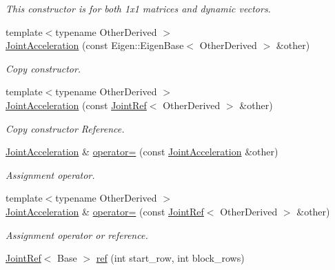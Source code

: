 \begin{DoxyCompactItemize}
\begin{DoxyCompactList}\small\item\em This constructor is for both 1x1 matrices and dynamic vectors. \end{DoxyCompactList}\item 
{\footnotesize template$<$typename Other\+Derived $>$ }\\\hyperlink{classow__core_1_1JointAcceleration_a84e8c4190777f4f93b7a45f5e0195d5d}{Joint\+Acceleration} (const Eigen\+::\+Eigen\+Base$<$ Other\+Derived $>$ \&other)
\begin{DoxyCompactList}\small\item\em Copy constructor. \end{DoxyCompactList}\item 
{\footnotesize template$<$typename Other\+Derived $>$ }\\\hyperlink{classow__core_1_1JointAcceleration_a2991fa7f90c16d8aa34dabbee91c853d}{Joint\+Acceleration} (const \hyperlink{classow__core_1_1JointRef}{Joint\+Ref}$<$ Other\+Derived $>$ \&other)
\begin{DoxyCompactList}\small\item\em Copy constructor Reference. \end{DoxyCompactList}\item 
\hyperlink{classow__core_1_1JointAcceleration}{Joint\+Acceleration} \& \hyperlink{classow__core_1_1JointAcceleration_a7d3a9a810ddf3b1d6e82d8930d46765b}{operator=} (const \hyperlink{classow__core_1_1JointAcceleration}{Joint\+Acceleration} \&other)\hypertarget{classow__core_1_1JointAcceleration_a7d3a9a810ddf3b1d6e82d8930d46765b}{}\label{classow__core_1_1JointAcceleration_a7d3a9a810ddf3b1d6e82d8930d46765b}

\begin{DoxyCompactList}\small\item\em Assignment operator. \end{DoxyCompactList}\item 
{\footnotesize template$<$typename Other\+Derived $>$ }\\\hyperlink{classow__core_1_1JointAcceleration}{Joint\+Acceleration} \& \hyperlink{classow__core_1_1JointAcceleration_a11ec687714cf6cd782d66339f7cbeac7}{operator=} (const \hyperlink{classow__core_1_1JointRef}{Joint\+Ref}$<$ Other\+Derived $>$ \&other)\hypertarget{classow__core_1_1JointAcceleration_a11ec687714cf6cd782d66339f7cbeac7}{}\label{classow__core_1_1JointAcceleration_a11ec687714cf6cd782d66339f7cbeac7}

\begin{DoxyCompactList}\small\item\em Assignment operator or reference. \end{DoxyCompactList}\item 
\hyperlink{classow__core_1_1JointRef}{Joint\+Ref}$<$ Base $>$ \hyperlink{classow__core_1_1JointAcceleration_a3f639f887c8af635ea895da86bc76413}{ref} (int start\+\_\+row, int block\+\_\+rows)\hypertarget{classow__core_1_1JointAcceleration_a3f639f887c8af635ea895da86bc76413}{}\label{classow__core_1_1JointAcceleration_a3f639f887c8af635ea895da86bc76413}


\end{DoxyCompactItemize}
